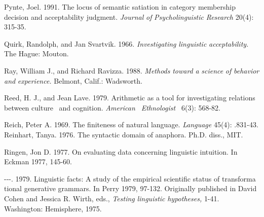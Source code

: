 \clearpage\setcounter{page}{1}\begin{styleStandard}
Pynte, Joel. 1991. The locus of semantic satiation in category membership decision and acceptability judgment. \textit{Journal}\textit{ }\textit{of}\textit{ }\textit{Psycholinguistic}\textit{ }\textit{Research}\textit{ }20(4): 315-35.
\end{styleStandard}


\begin{styleStandard}
Quirk, Randolph, and Jan Svartvik. 1966. \textit{Investigating}\textit{ }\textit{linguistic}\textit{ }\textit{acceptability.}\textit{ }The Hague: Mouton.
\end{styleStandard}


\begin{styleStandard}
Ray, William J., and Richard Ravizza. 1988. \textit{Methods}\textit{ }\textit{toward}\textit{ }\textit{a}\textit{ }\textit{science}\textit{ }\textit{of}\textit{ }\textit{behavior}\textit{ }\textit{and}\textit{ }\textit{experience.}\textit{ }Belmont, Calif.: Wadsworth.
\end{styleStandard}


\begin{styleStandard}
Reed, H. J., and Jean Lave. 1979. Arithmetic as a tool for investigating relations between culture \ and cognition. \textit{American }\textit{\ }\textit{Ethnologist }\textit{\ }6(3): 568-82.
\end{styleStandard}


\begin{styleStandard}
Reich, Peter A. 1969. The finiteness of natural language. \textit{Language}\textit{ }45(4): .831-43. Reinhart, Tanya. 1976. The syntactic domain of anaphora. Ph.D. diss., MIT.
\end{styleStandard}


\begin{styleStandard}
Ringen, Jon D. 1977. On evaluating data concerning linguistic intuition. In Eckman 1977, 145-60.
\end{styleStandard}


\begin{styleStandard}
{}-{}-{}-. 1979. Linguistic facts: A study of the empirical scientific status of transforma\- tional generative grammars. In Perry 1979, 97-132. Originally published in David Cohen and Jessica R. Wirth, eds., \textit{Testing}\textit{ }\textit{linguistic}\textit{ }\textit{hypotheses,}\textit{ }1-41. Washington: Hemisphere, 1975.
\end{styleStandard}


